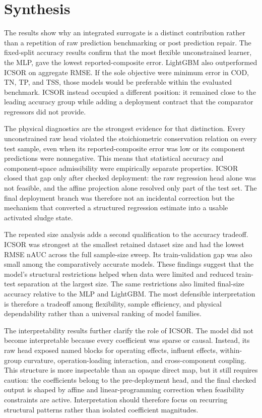 \documentclass[12pt, twoside]{book}
\begin{document}
\section{Synthesis}

The results show why an integrated surrogate is a distinct contribution rather than a repetition of raw
prediction benchmarking or post prediction repair. The fixed-split accuracy results confirm that the most
flexible unconstrained learner, the MLP, gave the lowest reported-composite error. LightGBM also outperformed
ICSOR on aggregate RMSE. If the sole objective were minimum error in COD, TN, TP, and TSS, those models would
be preferable within the evaluated benchmark. ICSOR instead occupied a different position: it remained close
to the leading accuracy group while adding a deployment contract that the comparator regressors did not
provide.

The physical diagnostics are the strongest evidence for that distinction. Every unconstrained raw head
violated the stoichiometric conservation relation on every test sample, even when its reported-composite error
was low or its component predictions were nonnegative. This means that statistical accuracy and
component-space admissibility were empirically separate properties. ICSOR closed that gap only after checked
deployment: the raw regression head alone was not feasible, and the affine projection alone resolved only part
of the test set. The final deployment branch was therefore not an incidental correction but the mechanism that
converted a structured regression estimate into a usable activated sludge state.

The repeated size analysis adds a second qualification to the accuracy tradeoff. ICSOR was strongest at the
smallest retained dataset size and had the lowest RMSE nAUC across the full sample-size sweep. Its
train-validation gap was also small among the comparatively accurate models. These findings suggest that the
model's structural restrictions helped when data were limited and reduced train-test separation at the largest
size. The same restrictions also limited final-size accuracy relative to the MLP and LightGBM. The most
defensible interpretation is therefore a tradeoff among flexibility, sample efficiency, and physical
dependability rather than a universal ranking of model families.

The interpretability results further clarify the role of ICSOR. The model did not become interpretable because
every coefficient was sparse or causal. Instead, its raw head exposed named blocks for operating effects,
influent effects, within-group curvature, operation-loading interaction, and cross-component coupling. This
structure is more inspectable than an opaque direct map, but it still requires caution: the coefficients belong
to the pre-deployment head, and the final checked output is shaped by affine and linear-programming correction
when feasibility constraints are active. Interpretation should therefore focus on recurring structural
patterns rather than isolated coefficient magnitudes.
\end{document}
